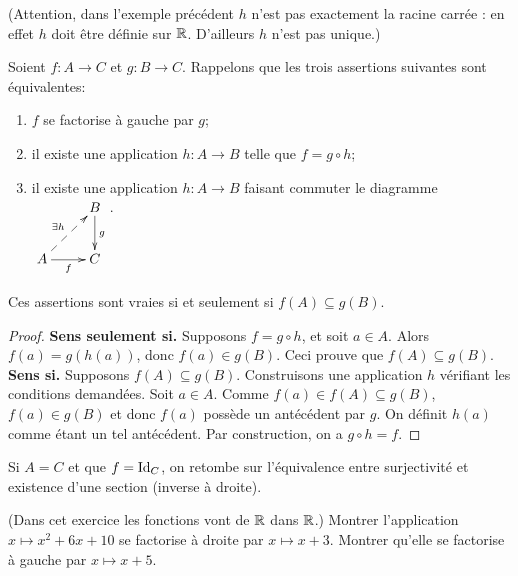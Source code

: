 (Attention, dans l'exemple précédent $h$ n'est pas exactement la racine carrée : en effet $h$ doit être définie sur $\mathbb{R}$. D'ailleurs $h$ n'est pas unique.)




\begin{proposition}
\label{prop-CNS-factorisation-gauche}
Soient $f : A\to C$ et $g : B\to C$. Rappelons que les trois assertions suivantes sont équivalentes:
\begin{enumerate}
\item  $f$ se factorise à gauche par $g$;
\item il existe une application $h : A\to B$ telle que $f = g\circ h$;
\item il existe une application $h : A\to B$ faisant commuter le diagramme  
$\xymatrix{
&B \ar[d]^{g} \\
A \ar[r]_f \ar@{-->}[ur]^{\exists h}& C
}$.
\end{enumerate}
Ces assertions sont vraies si et seulement si $f(A)\subseteq g(B)$.
\end{proposition}
\begin{proof}
\textbf{Sens \og seulement si\fg.} Supposons $f = g\circ h$, et soit $a\in A$. Alors $f(a) = g(h(a))$, donc $f(a) \in g(B)$. Ceci prouve que $f(A)\subseteq g(B)$.\\
\textbf{Sens \og si\fg.} Supposons $f(A)\subseteq g(B)$. Construisons une application $h$ vérifiant les conditions demandées. Soit $a\in A$. Comme $f(a) \in f(A) \subseteq g(B)$, $f(a) \in g(B)$ et donc $f(a)$ possède un antécédent par $g$. On définit $h(a)$ comme étant un tel antécédent. Par construction, on a $g\circ h = f$.
\end{proof}

\begin{remarque}
Si $A = C$ et que $f = \operatorname{Id}_C$, on retombe sur l'équivalence entre surjectivité et existence d'une section (inverse à droite).
\end{remarque}

\begin{exercice} 
(Dans cet exercice les fonctions vont de $\mathbb{R}$ dans $\mathbb{R}$.) 
Montrer l'application $x\mapsto x^2+6x+10$ se factorise à droite par $x\mapsto x+3$.
 Montrer qu'elle se factorise à gauche par $x\mapsto x+5$.
\end{exercice}







